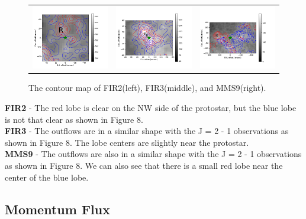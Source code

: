 \documentclass[twoside,11pt]{gshs_thesis}
\begin{document}
\begin{figure}[h!]
	\begin{tabular}{ccc}
		\includegraphics[width = 5cm]{Orion_12CO_NRO_HOPS68_rbcontour_400.png} & \includegraphics[width = 5cm]{Orion_12CO_NRO_HOPS370_rbcontour_400.png} & \includegraphics[width = 5cm]{Orion_12CO_NRO_HOPS78_rbcontour_400.png}
		\label{10}
	\end{tabular}
	
	\caption{The contour map of FIR2(left), FIR3(middle), and MMS9(right). }
\end{figure}
 
 
\noindent \textbf{FIR2} - The red lobe is clear on the NW side of the protostar, but the blue lobe is not that clear as shown in Figure 8.\\
\textbf{FIR3} - The outflows are in a similar shape with the J = 2 - 1 observations as shown in Figure 8. The lobe centers are slightly near the protostar.\\
\textbf{MMS9} - The outflows are also in a similar shape with the J = 2 - 1 observations as shown in Figure 8. We can also see that there is a small red lobe near the center of the blue lobe.\\
\newpage

\subsection{Momentum Flux}
\end{document}
